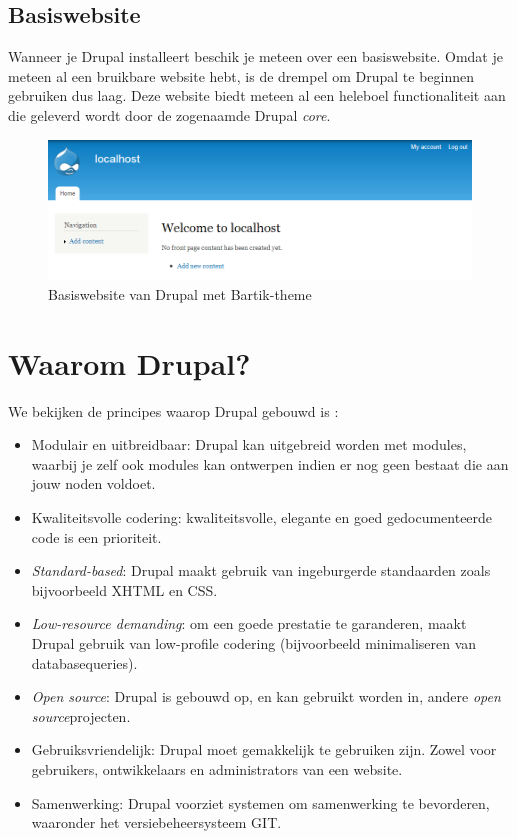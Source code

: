 \subsection{Basiswebsite}
Wanneer je Drupal installeert beschik je meteen over een basiswebsite. Omdat je meteen al een bruikbare website hebt, is de drempel om Drupal te beginnen gebruiken dus laag. Deze website biedt meteen al een heleboel functionaliteit aan die geleverd wordt door de zogenaamde Drupal \textit{core}. %
\begin{figure}[h]
\begin{center}
\includegraphics[keepaspectratio,width=1\textwidth]{fig/drupalBasiswebsite}
\vspace{-10pt}
\caption{Basiswebsite van Drupal met Bartik-theme}
\vspace{-30pt}
\end{center}
\end{figure}

\section{Waarom Drupal?}
We bekijken de principes waarop Drupal gebouwd is \cite{drupalMission}:
\begin{itemize}
\item Modulair en uitbreidbaar: Drupal kan uitgebreid worden met modules, waarbij je zelf ook modules kan ontwerpen indien er nog geen bestaat die aan jouw noden voldoet.
\item Kwaliteitsvolle codering: kwaliteitsvolle, elegante en goed gedocumenteerde code is een prioriteit.
\item \textit{Standard-based}: Drupal maakt gebruik van ingeburgerde standaarden zoals bijvoorbeeld XHTML en CSS.
\item \textit{Low-resource demanding}: om een goede prestatie te garanderen, maakt Drupal gebruik van low-profile codering (bijvoorbeeld minimaliseren van databasequeries).
\item \textit{Open source}: Drupal is gebouwd op, en kan gebruikt worden in, andere \textit{open source}projecten.
\item Gebruiksvriendelijk: Drupal moet gemakkelijk te gebruiken zijn. Zowel voor gebruikers, ontwikkelaars en administrators van een website.
\item Samenwerking: Drupal voorziet systemen om samenwerking te bevorderen, waaronder het versiebeheersysteem GIT.
\end{itemize}

